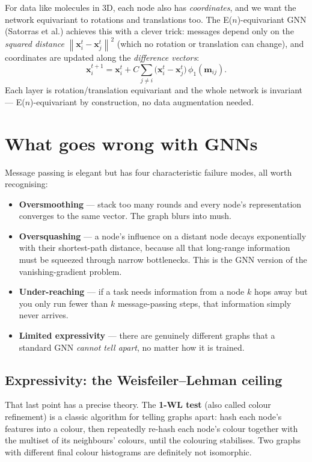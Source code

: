 \documentclass[11pt, oneside]{book}
\newcommand{\norm}[1]{\left\lVert #1 \right\rVert}
\newcommand{\xvec}{\mathbf{x}}
\begin{document}
For data like molecules in 3D, each node also has \emph{coordinates}, and we want
the network equivariant to rotations and translations too. The E($n$)-equivariant
GNN (Satorras et al.) achieves this with a clever trick: messages depend only on
the \emph{squared distance} $\norm{\xvec_i^{t}-\xvec_j^{t}}^2$ (which no rotation
or translation can change), and coordinates are updated along the
\emph{difference vectors}:
\[
  \xvec_i^{t+1} = \xvec_i^{t}
    + C\sum_{j\neq i}\bigl(\xvec_i^{t}-\xvec_j^{t}\bigr)\,\phi_1(\mathbf{m}_{ij}).
\]
Each layer is rotation/translation equivariant and the whole network is invariant
--- E($n$)-equivariant by construction, no data augmentation needed.

\section{What goes wrong with GNNs}

Message passing is elegant but has four characteristic failure modes, all worth
recognising:
\begin{itemize}
  \item \textbf{Oversmoothing} --- stack too many rounds and every node's
        representation converges to the same vector. The graph blurs into mush.
  \item \textbf{Oversquashing} --- a node's influence on a distant node decays
        exponentially with their shortest-path distance, because all that
        long-range information must be squeezed through narrow bottlenecks. This is
        the GNN version of the vanishing-gradient problem.
  \item \textbf{Under-reaching} --- if a task needs information from a node $k$
        hops away but you only run fewer than $k$ message-passing steps, that
        information simply never arrives.
  \item \textbf{Limited expressivity} --- there are genuinely different graphs that
        a standard GNN \emph{cannot tell apart}, no matter how it is trained.
\end{itemize}

\subsection{Expressivity: the Weisfeiler--Lehman ceiling}

That last point has a precise theory. The \textbf{1-WL test} (also called colour
refinement) is a classic algorithm for telling graphs apart: hash each node's
features into a colour, then repeatedly re-hash each node's colour together with
the multiset of its neighbours' colours, until the colouring stabilises. Two
graphs with different final colour histograms are definitely not isomorphic.
\end{document}
